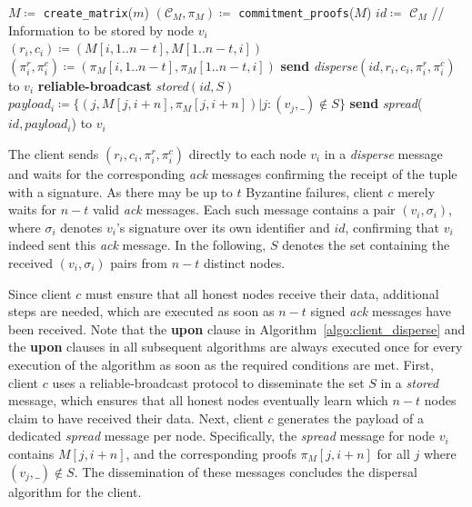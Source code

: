 \documentclass[sigconf,screen]{acmart}
\begin{document}
\begin{algorithm}[t]
\begin{algorithmic}[1]
\small
\caption{Dispersal at client $c$ of data item $m$ with identifier $id$.}
    \label{algo:client_disperse}
\State $M \coloneqq$ \texttt{create\_matrix}($m$)
\State $(\mathcal{C}_M, \pi_M) \coloneqq$ \texttt{commitment\_proofs}($M$)
\State $id \coloneqq$ $\mathcal{C}_M$
\State // Information to be stored by node $v_i$
\State $(r_i, c_i) \coloneqq (M[i,1..n-t], M[1..n-t,i])$
\State $(\pi^r_{i}, \pi^c_{i}) \coloneqq (\pi_M[i,1..n-t], \pi_M[1..n-t,i])$
\State \textbf{send} \emph{disperse}$(id, r_i, c_i,\pi^r_{i},\pi^c_{i})$ to $v_i$
\EndFor
{}
\State \textbf{reliable-broadcast} \emph{stored}$(id, S)$
\State $payload_i \coloneqq \{ (j, M[j,i+n], \pi_M[j,i+n]) |  j: (v_j,\_) \notin S\}$
\State \textbf{send} \emph{spread}($id, payload_i$) to $v_i$
\EndFor
\EndUpon
\end{algorithmic}
\end{algorithm}

The client sends $(r_i, c_i, \pi_i^r, \pi_i^c)$ directly to each node $v_i$ in a \emph{disperse} message and waits for the corresponding \emph{ack} messages confirming the receipt of the tuple with a signature. As there may be up to $t$ Byzantine failures, client $c$ merely waits for $n-t$ valid \emph{ack} messages. Each such message contains a pair $(v_i, \sigma_i)$, where $\sigma_i$ denotes $v_i$'s signature over its own identifier and $id$, confirming that $v_i$ indeed sent this \emph{ack} message.
In the following, $S$ denotes the set containing the received $(v_i, \sigma_i)$ pairs from $n-t$ distinct nodes.

Since client $c$ must ensure that all honest nodes receive their data, additional steps
are needed, which are executed as soon as $n-t$ signed \emph{ack} messages have been received. Note that the \textbf{upon} clause in Algorithm~\ref{algo:client_disperse} and the \textbf{upon} clauses in all subsequent algorithms are always executed once for every execution of the algorithm as soon as the required conditions are met.
%
First, client $c$ uses a reliable-broadcast protocol to disseminate the set $S$ in a \emph{stored} message, which ensures that all honest nodes eventually learn which $n-t$ nodes claim to have received their data.
%
Next, client $c$ generates the payload of a dedicated \emph{spread} message per node. Specifically, the \emph{spread} message for node $v_i$ contains $M[j, i+n]$, and the corresponding proofs  $\pi_M[j, i+n]$ for all $j$ where $(v_j, \_) \notin S$. The dissemination of these messages concludes the dispersal algorithm for the client.
\end{document}
